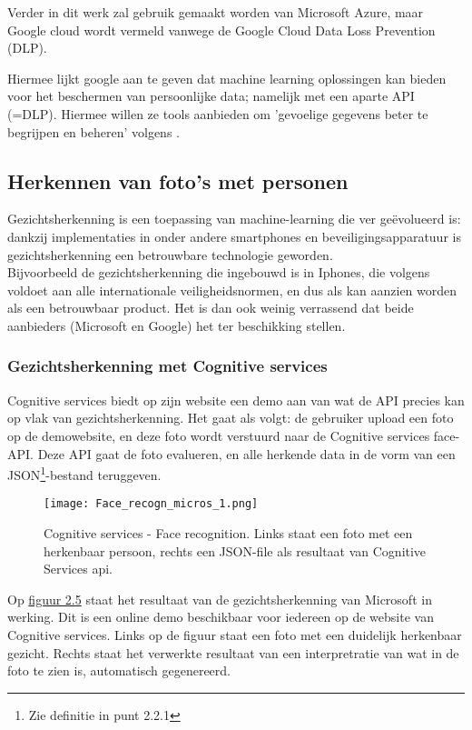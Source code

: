 Verder in dit werk zal gebruik gemaakt worden van Microsoft Azure, maar Google cloud wordt vermeld vanwege de Google Cloud Data Loss Prevention (DLP). 

Hiermee lijkt google aan te geven dat machine learning oplossingen kan bieden voor het beschermen van persoonlijke data; namelijk met een aparte API (=DLP). Hiermee willen ze tools aanbieden om 'gevoelige gegevens beter te begrijpen en beheren' volgens \textcite{Google2019}.

\subsection{Herkennen van foto's met personen}
Gezichtsherkenning is een toepassing van machine-learning die ver geëvolueerd is: dankzij implementaties in onder andere smartphones en beveiligingsapparatuur is gezichtsherkenning een betrouwbare technologie geworden. \\
Bijvoorbeeld de gezichtsherkenning die ingebouwd is in Iphones, die volgens \textcite{Support2019} voldoet aan alle internationale veiligheidsnormen, en dus als kan aanzien worden als een betrouwbaar product. 
Het is dan ook weinig verrassend dat beide aanbieders (Microsoft en Google) het ter beschikking stellen. 

\subsubsection{Gezichtsherkenning met Cognitive services}
Cognitive services biedt op zijn website een demo aan van wat de API precies kan op vlak van gezichtsherkenning. Het gaat als volgt: de gebruiker upload een foto op de demowebsite, en deze foto wordt verstuurd naar de Cognitive services face-API. Deze API gaat de foto evalueren, en alle herkende data in de vorm van een JSON\footnote{Zie definitie in punt 2.2.1}-bestand teruggeven. 

\begin{figure}[h]
	\texttt{[image: Face\_recogn\_micros\_1.png]}
	\caption{Cognitive services - Face recognition. Links staat een foto met een herkenbaar persoon, rechts een JSON-file als resultaat van Cognitive Services api.}
	\label{fig:cognitive}
\end{figure}

Op \hyperref[fig:cognitive]{figuur 2.5} staat het resultaat van de gezichtsherkenning van Microsoft in werking. Dit is een online demo beschikbaar voor iedereen op de website van Cognitive services. Links op de figuur staat een foto met een duidelijk herkenbaar gezicht. Rechts staat het verwerkte resultaat van een interpretratie van wat in de foto te zien is, automatisch gegenereerd. 

